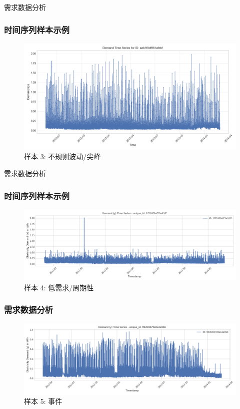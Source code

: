 \documentclass{beamer} %
\begin{document}
\begin{frame}{需求数据分析}
    \frametitle{时间序列样本示例}
    \begin{figure}
        \centering
        \includegraphics[width=\textwidth]{../plots/timeseries_sample_aab1f0df961afebf.png}
        
        \caption{样本 3: 不规则波动/尖峰}
    \end{figure}
\end{frame}

\begin{frame}{需求数据分析}
    \frametitle{时间序列样本示例}
    \begin{figure}
        \centering
        \includegraphics[width=\textwidth]{../plots/timeseries_sample_1f718f5ef73e91ff.png}
        \caption{样本 4: 低需求/周期性}
    \end{figure}
\end{frame}

\begin{frame}
    \frametitle{需求数据分析}
    \begin{figure}
        \centering
        \includegraphics[width=\textwidth]{../plots/timeseries_sample_99d59d79d2e2a966.png}
        \caption{样本 5: 事件}
    \end{figure}
\end{frame}
\end{document}

